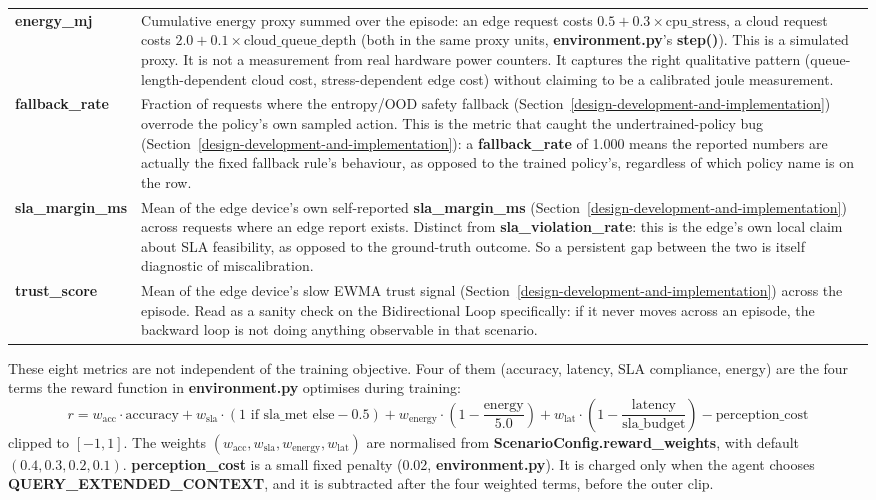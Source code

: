 \begin{longtable}{p{2.7cm}p{9.8cm}}
\textbf{energy\_mj} & Cumulative energy proxy summed over the episode: an edge request costs $0.5 + 0.3 \times \text{cpu\_stress}$, a cloud request costs $2.0 + 0.1 \times \text{cloud\_queue\_depth}$ (both in the same proxy units, \textbf{environment.py}'s \textbf{step()}). This is a simulated proxy. It is not a measurement from real hardware power counters. It captures the right qualitative pattern (queue-length-dependent cloud cost, stress-dependent edge cost) without claiming to be a calibrated joule measurement. \\
\textbf{fallback\_rate} & Fraction of requests where the entropy/OOD safety fallback (Section~\ref{design-development-and-implementation}) overrode the policy's own sampled action. This is the metric that caught the undertrained-policy bug (Section~\ref{design-development-and-implementation}): a \textbf{fallback\_rate} of 1.000 means the reported numbers are actually the fixed fallback rule's behaviour, as opposed to the trained policy's, regardless of which policy name is on the row. \\
\textbf{sla\_margin\_ms} & Mean of the edge device's own self-reported \textbf{sla\_margin\_ms} (Section~\ref{design-development-and-implementation}) across requests where an edge report exists. Distinct from \textbf{sla\_violation\_rate}: this is the edge's own local claim about SLA feasibility, as opposed to the ground-truth outcome. So a persistent gap between the two is itself diagnostic of miscalibration. \\
\textbf{trust\_score} & Mean of the edge device's slow EWMA trust signal (Section~\ref{design-development-and-implementation}) across the episode. Read as a sanity check on the Bidirectional Loop specifically: if it never moves across an episode, the backward loop is not doing anything observable in that scenario. \\
\bottomrule
\end{longtable}

These eight metrics are not independent of the training objective. Four
of them (accuracy, latency, SLA compliance, energy) are the four
terms the reward function in \textbf{environment.py} optimises during
training:
\[
r = w_{\text{acc}} \cdot \text{accuracy} + w_{\text{sla}} \cdot (1 \text{ if sla\_met else} -0.5) + w_{\text{energy}} \cdot \left(1 - \frac{\text{energy}}{5.0}\right) + w_{\text{lat}} \cdot \left(1 - \frac{\text{latency}}{\text{sla\_budget}}\right) - \text{perception\_cost}
\]
clipped to $[-1, 1]$. The weights $(w_{\text{acc}}, w_{\text{sla}},
w_{\text{energy}}, w_{\text{lat}})$ are normalised from
\textbf{ScenarioConfig.reward\_weights}, with default $(0.4, 0.3, 0.2,
0.1)$. \textbf{perception\_cost} is a small fixed penalty (0.02,
\textbf{environment.py}). It is charged only when the agent chooses
\textbf{QUERY\_EXTENDED\_CONTEXT}, and it is subtracted after the four
weighted terms, before the outer clip.

